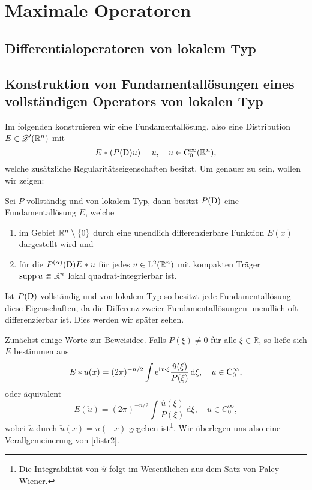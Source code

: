 \chapter{Maximale Operatoren}

\section{Differentialoperatoren von lokalem Typ} %


\section{Konstruktion von Fundamentallösungen eines vollständigen Operators von lokalen Typ} %

Im folgenden konstruieren wir eine Fundamentallösung, also eine Distribution $E\in\mathscr D'(\mathbb R^n)$ mit
\begin{equation}
E*(P(\mathrm D) u) = u, \quad u \in \mathrm C_0^\infty(\mathbb R^n),
\end{equation}
welche zusätzliche Regularitätseigenschaften besitzt.
Um genauer zu sein,  wollen wir zeigen:
\begin{thm}\label{fundamental_exist}
Sei $P$ vollständig und von lokalem Typ, dann besitzt $P(\mathrm D)$ eine Fundamentallösung $E$, welche 
\begin{enumerate}
\item im Gebiet $\mathbb R^n\setminus\{0\}$  durch eine unendlich differenzierbare Funktion $E(x)$ dargestellt wird und
\item für die $P^{(\alpha)}(\mathrm D) E*u$ für jedes $u\in \mathrm L^2(\mathbb R^n)$ mit kompakten Träger $\operatorname{supp} u\Subset\mathbb R^n$ lokal quadrat-integrierbar ist. 
\end{enumerate}
\end{thm}
\begin{rem}
Ist $P(\mathrm D)$ vollständig und von lokalem Typ so besitzt jede Fundamentallösung diese Eigenschaften, da die Differenz zweier Fundamentallösungen unendlich oft differenzierbar ist. Dies werden wir später sehen.
\end{rem}

Zunächst einige Worte zur Beweisidee.  Falls $P(\xi)\neq 0$ für alle $\xi\in \mathbb R$, so ließe sich $E$ bestimmen aus
\begin{equation}\label{distr1}
E*u(x) = (2\pi)^{-n/2}\int \mathrm e^{\mathrm i x\cdot \xi} \frac{\hat u(\xi)}{P(\xi)}\, \mathrm d\xi, \quad u \in \mathrm C_0^\infty,
\end{equation}
oder äquivalent
\begin{equation}\label{distr2}
E(\check u)= (2\pi)^{-n/2} \int \frac{\hat u(\xi)}{P(\xi)}\, \mathrm d\xi, \quad u \in C_0^\infty,
\end{equation}
wobei $\check u$ durch $\check u(x)=u(-x)$ gegeben ist\footnote{Die Integrabilität von $\hat u$ folgt im Wesentlichen aus dem Satz von Paley-Wiener.}. Wir überlegen uns also eine Verallgemeinerung von \eqref{distr2}. 

